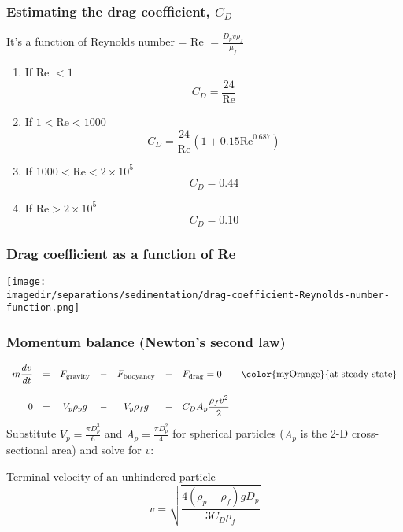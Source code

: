 \begin{frame}\frametitle{Estimating the drag coefficient, $C_D$}
	It's a function of Reynolds number = Re $= \displaystyle \frac{D_p v \rho_f}{\mu_f}$ \\
	\begin{enumerate} \label{CD-rules}
		\item	If Re $< 1$
				\[
					C_D = \frac{24}{\text{Re}}
				\]

		\item	If $1 < \text{Re} < \text{1000}$
				\[
					C_D = \frac{24}{\text{Re}}\left(1 + 0.15 \text{Re}^{0.687} \right)
				\]
		\item	If $\text{1000} < \text{Re} < 2\times10^5 $
				\[
					C_D = 0.44
				\]
		\item	If $\text{Re} > 2\times10^5 $
				\[
					C_D = 0.10
				\]
	\end{enumerate}
\end{frame}

\begin{frame}\frametitle{Drag coefficient as a function of Re}
	\begin{center}
		\texttt{[image: \\imagedir/separations/sedimentation/drag-coefficient-Reynolds-number-function.png]}
	\end{center}
\end{frame}

\begin{frame}\frametitle{Momentum balance (Newton's second law)}
	\[
	\begin{array}{rcccccl}
		\displaystyle m\frac{dv}{dt} &=&  F_\text{gravity} &-& F_\text{buoyancy} &-& F_\text{drag} = 0 \qquad \text{\color{myOrange}{at steady state}} \\
		\\
		0 &=&  V_p \rho_p g &-& V_p \rho_f g &-& C_D A_p \displaystyle \frac{\rho_f v^2}{2} \label{MB}
	\end{array}
	\]
	Substitute $V_p = \displaystyle \frac{\pi D_p^3}{6}$ and $A_p = \displaystyle \frac{\pi D_p^2}{4}$ for spherical particles ($A_p$ is the 2-D cross-sectional area) and solve for $v$:

	\begin{exampleblock}{Terminal velocity of an unhindered particle}
		\[
			v = \sqrt{\frac{4\left(\rho_p - \rho_f \right)g D_p}{3 C_D \rho_f}} \tag{TSV}
		\]
	\end{exampleblock}
\end{frame}

